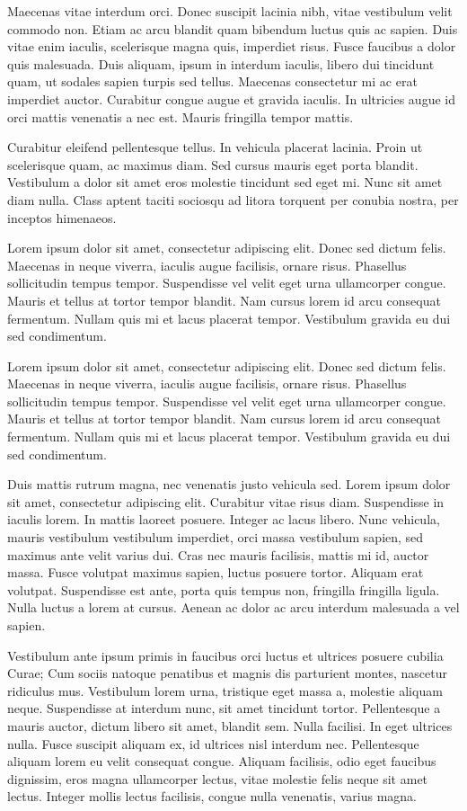 Maecenas vitae interdum orci. Donec suscipit lacinia nibh, vitae vestibulum velit commodo non. Etiam ac arcu blandit quam bibendum luctus quis ac sapien. Duis vitae enim iaculis, scelerisque magna quis, imperdiet risus. Fusce faucibus a dolor quis malesuada. Duis aliquam, ipsum in interdum iaculis, libero dui tincidunt quam, ut sodales sapien turpis sed tellus. Maecenas consectetur mi ac erat imperdiet auctor. Curabitur congue augue et gravida iaculis. In ultricies augue id orci mattis venenatis a nec est. Mauris fringilla tempor mattis.

Curabitur eleifend pellentesque tellus. In vehicula placerat lacinia. Proin ut scelerisque quam, ac maximus diam. Sed cursus mauris eget porta blandit. Vestibulum a dolor sit amet eros molestie tincidunt sed eget mi. Nunc sit amet diam nulla. Class aptent taciti sociosqu ad litora torquent per conubia nostra, per inceptos himenaeos. 	


Lorem ipsum dolor sit amet, consectetur adipiscing elit. Donec sed dictum felis. Maecenas in neque viverra, iaculis augue facilisis, ornare risus. Phasellus sollicitudin tempus tempor. Suspendisse vel velit eget urna ullamcorper congue. Mauris et tellus at tortor tempor blandit. Nam cursus lorem id arcu consequat fermentum. Nullam quis mi et lacus placerat tempor. Vestibulum gravida eu dui sed condimentum.

Lorem ipsum dolor sit amet, consectetur adipiscing elit. Donec sed dictum felis. Maecenas in neque viverra, iaculis augue facilisis, ornare risus. Phasellus sollicitudin tempus tempor. Suspendisse vel velit eget urna ullamcorper congue. Mauris et tellus at tortor tempor blandit. Nam cursus lorem id arcu consequat fermentum. Nullam quis mi et lacus placerat tempor. Vestibulum gravida eu dui sed condimentum.

Duis mattis rutrum magna, nec venenatis justo vehicula sed. Lorem ipsum dolor sit amet, consectetur adipiscing elit. Curabitur vitae risus diam. Suspendisse in iaculis lorem. In mattis laoreet posuere. Integer ac lacus libero. Nunc vehicula, mauris vestibulum vestibulum imperdiet, orci massa vestibulum sapien, sed maximus ante velit varius dui. Cras nec mauris facilisis, mattis mi id, auctor massa. Fusce volutpat maximus sapien, luctus posuere tortor. Aliquam erat volutpat. Suspendisse est ante, porta quis tempus non, fringilla fringilla ligula. Nulla luctus a lorem at cursus. Aenean ac dolor ac arcu interdum malesuada a vel sapien.

Vestibulum ante ipsum primis in faucibus orci luctus et ultrices posuere cubilia Curae; Cum sociis natoque penatibus et magnis dis parturient montes, nascetur ridiculus mus. Vestibulum lorem urna, tristique eget massa a, molestie aliquam neque. Suspendisse at interdum nunc, sit amet tincidunt tortor. Pellentesque a mauris auctor, dictum libero sit amet, blandit sem. Nulla facilisi. In eget ultrices nulla. Fusce suscipit aliquam ex, id ultrices nisl interdum nec. Pellentesque aliquam lorem eu velit consequat congue. Aliquam facilisis, odio eget faucibus dignissim, eros magna ullamcorper lectus, vitae molestie felis neque sit amet lectus. Integer mollis lectus facilisis, congue nulla venenatis, varius magna.

